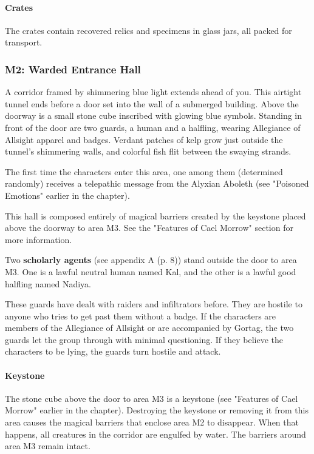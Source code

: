 \documentclass[letterpaper, 11pt, bg=full, twocolumn]{dndbook}
\begin{document}
\paragraph{Crates}

The crates contain recovered relics and specimens in glass jars, all packed for transport.

\subsubsection{M2: Warded Entrance Hall}

\begin{DndReadAloud}
A corridor framed by shimmering blue light extends ahead of you. This airtight tunnel ends before a door set into the wall of a submerged building. Above the doorway is a small stone cube inscribed with glowing blue symbols. Standing in front of the door are two guards, a human and a halfling, wearing Allegiance of Allsight apparel and badges. Verdant patches of kelp grow just outside the tunnel's shimmering walls, and colorful fish flit between the swaying strands.
\end{DndReadAloud}

The first time the characters enter this area, one among them (determined randomly) receives a telepathic message from the Alyxian Aboleth (see "Poisoned Emotions" earlier in the chapter).

This hall is composed entirely of magical barriers created by the keystone placed above the doorway to area M3. See the "Features of Cael Morrow" section for more information.

Two \textbf{scholarly agents} (see appendix A (p. 8)) stand outside the door to area M3. One is a lawful neutral human named Kal, and the other is a lawful good halfling named Nadiya.

These guards have dealt with raiders and infiltrators before. They are hostile to anyone who tries to get past them without a badge. If the characters are members of the Allegiance of Allsight or are accompanied by Gortag, the two guards let the group through with minimal questioning. If they believe the characters to be lying, the guards turn hostile and attack.

\paragraph{Keystone}

The stone cube above the door to area M3 is a keystone (see "Features of Cael Morrow" earlier in the chapter). Destroying the keystone or removing it from this area causes the magical barriers that enclose area M2 to disappear. When that happens, all creatures in the corridor are engulfed by water. The barriers around area M3 remain intact.
\end{document}
